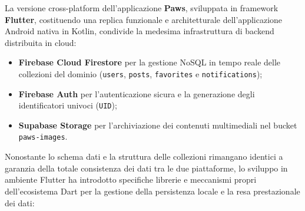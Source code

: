 \documentclass[a4paper]{report}
\begin{document}
 

La versione cross-platform dell'applicazione \textbf{Paws}, sviluppata in framework \textbf{Flutter}, costituendo una replica funzionale e architetturale dell'applicazione Android nativa in Kotlin, condivide la medesima infrastruttura di backend distribuita in cloud:
\begin{itemize}
    \item \textbf{Firebase Cloud Firestore} per la gestione NoSQL in tempo reale delle collezioni del dominio (\texttt{users}, \texttt{posts}, \texttt{favorites} e \texttt{notifications});
    \item \textbf{Firebase Auth} per l'autenticazione sicura e la generazione degli identificatori univoci (\texttt{UID});
    \item \textbf{Supabase Storage} per l'archiviazione dei contenuti multimediali nel bucket \texttt{paws-images}.
\end{itemize}

Nonostante lo schema dati e la struttura delle collezioni rimangano identici a garanzia della totale consistenza dei dati tra le due piattaforme, lo sviluppo in ambiente Flutter ha introdotto specifiche librerie e meccanismi propri dell'ecosistema Dart per la gestione della persistenza locale e la resa prestazionale dei dati:
\end{document}
